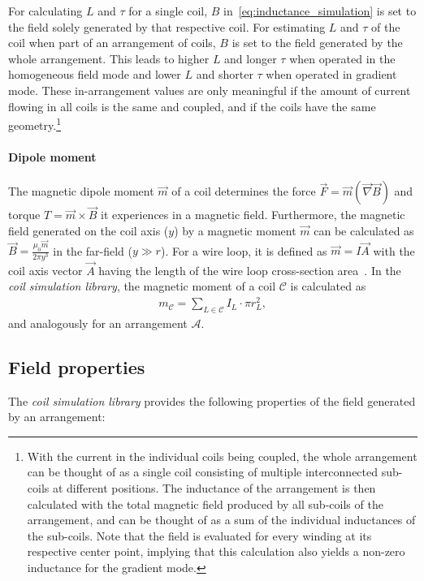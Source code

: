 For calculating $L$ and $\tau$ for a single coil, $B$ in~\eqref{eq:inductance_simulation} is set to the field solely generated by that respective coil. For estimating $L$ and $\tau$ of the coil when part of an arrangement of coils, $B$ is set to the field generated by the whole arrangement. This leads to higher $L$ and longer $\tau$ when operated in the homogeneous field mode and lower $L$ and shorter $\tau$ when operated in gradient mode. These in-arrangement values are only meaningful if the amount of current flowing in all coils is the same and coupled, and if the coils have the same geometry.\footnote{With the current in the individual coils being coupled, the whole arrangement can be thought of as a single coil consisting of multiple interconnected sub-coils at different positions. The inductance of the arrangement is then calculated with the total magnetic field produced by all sub-coils of the arrangement, and can be thought of as a sum of the individual inductances of the sub-coils. Note that the field is evaluated for every winding at its respective center point, implying that this calculation also yields a non-zero inductance for the gradient mode.}

\paragraph{Dipole moment}
The magnetic dipole moment $\vec m$ of a coil determines the force $\vec F = \vec m (\vec \nabla \vec B)$ and torque $T = \vec m \times \vec B$ it experiences in a magnetic field. Furthermore, the magnetic field generated on the coil axis ($y$) by a magnetic moment $\vec m$ can be calculated as $\vec B = \frac{\mu_0 \vec m}{2\pi y^3}$ in the far-field ($y \gg r$). For a wire loop, it is defined as $\vec m = I \vec A$ with the coil axis vector $\vec A$ having the length of the wire loop cross-section area~\cite{demtroder_statische_2013}. In the \textit{coil simulation library}, the magnetic moment of a coil $\mathcal{C}$ is calculated as
\begin{align}\label{eq:dipole_moment_simulation}
    m_\mathcal{C} = \sum\limits_{L \in \mathcal{C}} I_L \cdot \pi r_L^2,
\end{align}
and analogously for an arrangement $\mathcal{A}$.

\subsection*{Field properties}
The \textit{coil simulation library} provides the following properties of the field generated by an arrangement:

